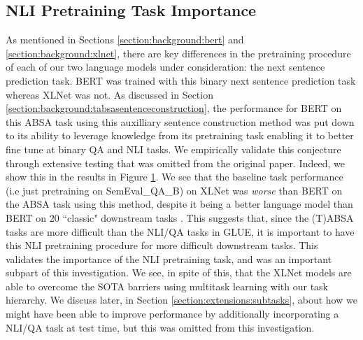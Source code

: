 \begin{figure}
	\label{fig:experiments:semevalaccs}
\end{figure}

\begin{figure}
	\label{fig:experiments:semevalaccsrelative}
\end{figure}

\begin{figure}
	\label{fig:experiments:semevalprf}
\end{figure}

\subsection{NLI Pretraining Task Importance} \label{section:experiments:nlipretrainingimportance}
As mentioned in Sections \ref{section:background:bert} and \ref{section:background:xlnet}, there are key differences in the pretraining procedure of each of our two language models under consideration: the next sentence prediction task. BERT was trained with this binary next sentence prediction task whereas XLNet was not. As discussed in Section \ref{section:background:tabsasentenceconstruction}, the performance for BERT on this ABSA task using this auxilliary sentence construction method was put down to its ability to leverage knowledge from its pretraining task enabling it to better fine tune at binary QA and NLI tasks.
We empirically validate this conjecture through extensive testing that was omitted from the original paper. Indeed, we show this in the results in Figure \ref{fig:experiments:semevalaccs}. We see that the baseline task performance (i.e just pretraining on SemEval\_QA\_B) on XLNet was \textit{worse} than BERT on the ABSA task using this method, despite it being a better language model than BERT on 20 ``classic" downstream tasks \cite{Yang2019}. This suggests that, since the (T)ABSA tasks are more difficult than the NLI/QA tasks in GLUE, it is important to have this NLI pretraining procedure for more difficult downstream tasks. This validates the importance of the NLI pretraining task, and was an important subpart of this investigation. We see, in spite of this, that the XLNet models are able to overcome the SOTA barriers using multitask learning with our task hierarchy.
We discuss later, in Section \ref{section:extensions:subtasks}, about how we might have been able to improve performance by additionally incorporating a NLI/QA task at test time, but this was omitted from this investigation. 

